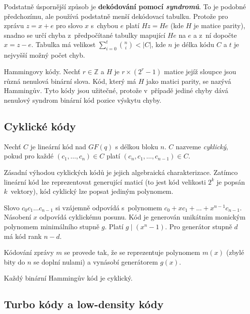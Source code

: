 Podstatně úspornější způsob je {\bf dekódování pomocí {\em syndromů}}. To je
podobné předchozímu, ale používá podstatně menší dekódovací tabulku.
Protože pro zprávu $z = x + e$ pro slovo $x$ s~chybou $e$ platí
$Hz = He$ (kde $H$ je matice parity), snadno se určí chyba
z~předpočítané tabulky mapující $He$ na $e$ a z~ní dopočte $x = z -e$.
Tabulka má velikost $\sum_{i = 0}^{t} {n \choose i} < \lvert C \rvert$,
kde $n$ je délka kódu $C$ a $t$ je nejvyšší možný počet chyb.


\begin{example}
    Hammingovy kódy. Nechť $r \in \mathbb{Z}$ a $H$ je
    $r \times (2^r-1)$ matice jejíž sloupce jsou různá nenulová binární
    slova. Kód, který má $H$ jako matici parity, se nazývá Hammingův.
    Tyto kódy jsou užitečné, protože v~případě jediné chyby dává
    nenulový syndrom binární kód pozice výskytu chyby.
\end{example}

\subsection{Cyklické kódy}

\begin{definition}
    Nechť $C$ je lineární kód nad $GF(q)$ s délkou bloku $n$.
    $C$ nazveme {\em cyklický}, pokud pro každé $(c_1,\ldots,c_n) \in C$
    platí $(c_n,c_1,\ldots,c_{n-1}) \in C$.
\end{definition}

Zásadní výhodou cyklických kódů je jejich algebraická charakterizace.
Zatímco lineární kód lze reprezentovat generující maticí (to jest kód
velikosti $2^k$ je popsán $k$~vektory), kód cyklický lze popsat
jediným polynomem.

Slovo $c_0c_1 \ldots c_{n-1}$ si vzájemně odpovídá s~polynomem
$c_0 + x c_1 + \ldots + x^{n-1} c_{n-1}$. Násobení $x$ odpovídá
cyklickému posunu. Kód je generován unikátním monickým polynomem
minimálního stupně $g$. Platí $g \mid (x^n - 1)$.
Pro generátor stupně $d$ má kód rank $n - d$.

Kódování zprávy $m$ se provede tak, že se reprezentuje polynomem $m(x)$
(zbylé bity do $n$ se doplní nulami)
a vynásobí generátorem $g(x)$.

Každý binární Hammingův kód je cyklický.

\subsection{Turbo kódy a low-density kódy}

